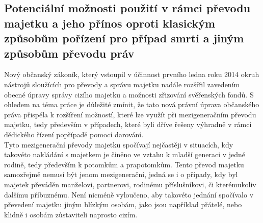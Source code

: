 \documentclass{article}
\begin{document}
\subsection{Potenciální možnosti použití v rámci převodu majetku a jeho přínos oproti klasickým způsobům pořízení pro případ smrti a jiným způsobům převodu práv}




Nový občanský zákoník, který vstoupil v účinnost prvního ledna roku 2014 okruh nástrojů sloužících pro převody a správu majetku nadále rozšířil zavedením obecné úpravy správy cizího majetku a možnosti zřizování svěřenských fondů. S ohledem na téma práce je důležité zmínit, že tato nová právní úprava občanského práva přispěla k rozšíření možností, které lze využít při mezigeneračním převodu majetku, tedy především v případech, které byli dříve řešeny výhradně v rámci dědického řízení popřípadě pomocí darování.\\

Tyto mezigenerační převody majetku spočívají nejčastěji v situacích, kdy takovéto nakládání s majetkem je činěno ve vztahu k mladší generaci v jedné rodině, tedy především k potomkům a prapotomkům. %
Tento převod majetku samozřejmě nemusí být jenom mezigenerační, jedná se i o případy, kdy byl majetek převáděn manželovi, partnerovi, rodinému příslušníkovi, či kterémukoliv dalšímu příbuznému. Není nicméně vyloučeno, aby takovéto jednání spočívalo v převedení majetku jiným blízkým osobám, jako jsou například přátelé, nebo klidně i osobám zůstaviteli naprosto cizím.\\
\end{document}
